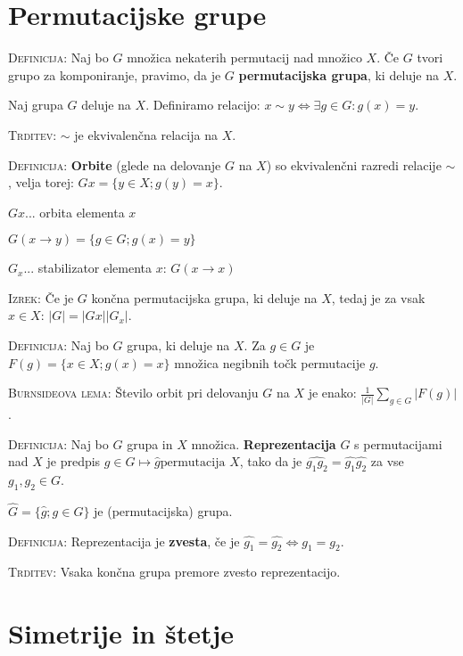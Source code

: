 \documentclass[8pt,a4paper]{amsart}
\theoremstyle{definition} %
\theoremstyle{plain} %
\begin{document}
\thispagestyle{empty}
\setlength{\parindent}{0pt}

\section{Permutacijske grupe}

\textsc{Definicija:} Naj bo $G$ množica nekaterih permutacij nad množico $X$. Če
$G$ tvori grupo za komponiranje, pravimo, da je $G$ \textbf{permutacijska
grupa}, ki deluje na $X$.

Naj grupa $G$ deluje na $X$. Definiramo relacijo: $x \sim y \Longleftrightarrow
\exists g \in G: g(x)=y$.

\textsc{Trditev:} $\sim$ je ekvivalenčna relacija na $X$.

\textsc{Definicija:} \textbf{Orbite} (glede na delovanje $G$ na $X$) so
ekvivalenčni razredi relacije $\sim$, velja torej: $Gx = \{ y \in X; g(y) = x
\}$.

$Gx$... orbita elementa $x$

$G(x \rightarrow y) = \{ g \in G; g(x)=y \}$

$G_x$... stabilizator elementa $x$: $G(x \rightarrow x)$

\textsc{Izrek:} Če je $G$ končna permutacijska grupa, ki deluje na $X$, tedaj je
za vsak $x \in X$:  $|G| = |Gx| |G_x|$.

\textsc{Definicija}: Naj bo $G$ grupa, ki deluje na $X$. Za $g \in G$ je $F(g) =
\{ x\in X; g(x) = x \}$ množica negibnih točk permutacije $g$.

\textsc{Burnsideova lema:} Število orbit pri delovanju $G$ na $X$ je enako:  $\frac{1}{|G|}
\sum_{g \in G}|F(g)|$.

\textsc{Definicija:} Naj bo $G$ grupa in $X$ množica. \textbf{Reprezentacija}
$G$ s permutacijami nad $X$ je predpis $g \in G \mapsto \hat{g} \text{
permutacija } X$, tako da je $\widehat{g_1g_2} = \widehat{g_1}\widehat{g_2}$ za
vse $g_1,g_2 \in G$.

$\widehat{G} = \{ \widehat{g} ; g\in G \}$ je (permutacijska) grupa.

\textsc{Definicija:} Reprezentacija je \textbf{zvesta}, če je $\widehat{g_1} =
\widehat{g_2} \Longleftrightarrow g_1 = g_2$.

\textsc{Trditev:} Vsaka končna grupa premore zvesto reprezentacijo.


\section{Simetrije in štetje}
\end{document}

